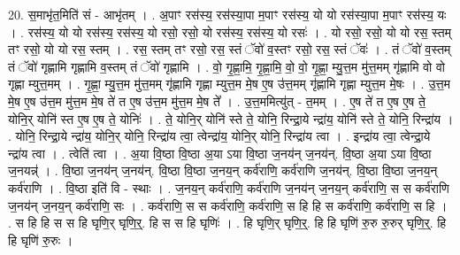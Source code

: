 \documentclass[17pt]{extarticle}
\begin{document}
20. स॒माभृ॑त॒मिति॑ सं - आभृ॑तम् । . अ॒पाꣳ रस॑स्य॒ रस॑स्या॒पा म॒पाꣳ रस॑स्य॒ यो यो रस॑स्या॒पा म॒पाꣳ रस॑स्य॒ यः । . रस॑स्य॒ यो यो रस॑स्य॒ रस॑स्य॒ यो रसो॒ रसो॒ यो रस॑स्य॒ रस॑स्य॒ यो रसः॑ । . यो रसो॒ रसो॒ यो यो रस॒ स्तम् तꣳ रसो॒ यो यो रस॒ स्तम् । . रस॒ स्तम् तꣳ रसो॒ रस॒ स्तं ॅवो॑ व॒स्तꣳ रसो॒ रस॒ स्तं ॅवः॑ । . तं ॅवो॑ व॒स्तम् तं ॅवो॑ गृह्णामि गृह्णामि व॒स्तम् तं ॅवो॑ गृह्णामि । . वो॒ गृ॒ह्णा॒मि॒ गृ॒ह्णा॒मि॒ वो॒ वो॒ गृ॒ह्णा॒ म्यु॒त्त॒म मु॑त्त॒मम् गृ॑ह्णामि वो वो गृह्णा म्युत्त॒मम् । . गृ॒ह्णा॒ म्यु॒त्त॒म मु॑त्त॒मम् गृ॑ह्णामि गृह्णा म्युत्त॒म मे॒ष ए॒ष उ॑त्त॒मम् गृ॑ह्णामि गृह्णा म्युत्त॒म मे॒षः । . उ॒त्त॒म मे॒ष ए॒ष उ॑त्त॒म मु॑त्त॒म मे॒ष ते॑ त ए॒ष उ॑त्त॒म मु॑त्त॒म मे॒ष ते᳚ । . उ॒त्त॒ममित्यु॑त् - त॒मम् । . ए॒ष ते॑ त ए॒ष ए॒ष ते॒ योनि॒र् योनि॑ स्त ए॒ष ए॒ष ते॒ योनिः॑ । . ते॒ योनि॒र् योनि॑ स्ते ते॒ योनि॒ रिन्द्रा॒ये न्द्रा॑य॒ योनि॑ स्ते ते॒ योनि॒ रिन्द्रा॑य । . योनि॒ रिन्द्रा॒ये न्द्रा॑य॒ योनि॒र् योनि॒ रिन्द्रा॑य त्वा॒ त्वेन्द्रा॑य॒ योनि॒र् योनि॒ रिन्द्रा॑य त्वा । . इन्द्रा॑य त्वा॒ त्वेन्द्रा॒ये न्द्रा॑य त्वा । . त्वेति॑ त्वा । . अ॒या वि॒ष्ठा वि॒ष्ठा अ॒या ऽया वि॒ष्ठा ज॒नय॑न् ज॒नय॑न्. वि॒ष्ठा अ॒या ऽया वि॒ष्ठा ज॒नयन्न्॑ । . वि॒ष्ठा ज॒नय॑न् ज॒नय॑न्. वि॒ष्ठा वि॒ष्ठा ज॒नय॒न् कर्व॑राणि॒ कर्व॑राणि ज॒नय॑न्. वि॒ष्ठा वि॒ष्ठा ज॒नय॒न् कर्व॑राणि । . वि॒ष्ठा इति॑ वि - स्थाः । . ज॒नय॒न् कर्व॑राणि॒ कर्व॑राणि ज॒नय॑न् ज॒नय॒न् कर्व॑राणि॒ स स कर्व॑राणि ज॒नय॑न् ज॒नय॒न् कर्व॑राणि॒ सः । . कर्व॑राणि॒ स स कर्व॑राणि॒ कर्व॑राणि॒ स हि हि स कर्व॑राणि॒ कर्व॑राणि॒ स हि । . स हि हि स स हि घृणि॒र् घृणि॒र्॒. हि स स हि घृणिः॑ । . हि घृणि॒र् घृणि॒र्॒. हि हि घृणि॑ रु॒रु रु॒रुर् घृणि॒र्॒. हि हि घृणि॑ रु॒रुः । \newline
\end{document}
